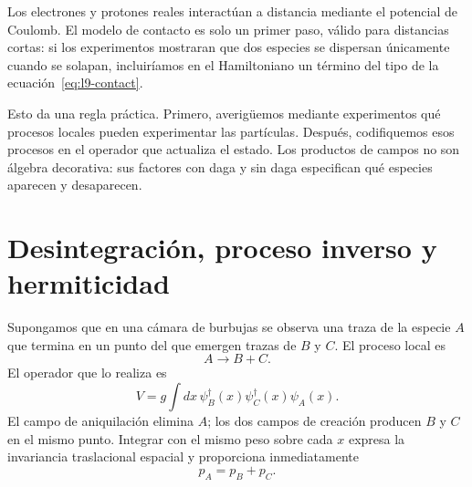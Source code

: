 Los electrones y protones reales interactúan a distancia mediante el potencial de Coulomb. El modelo de contacto es solo un primer paso, válido para distancias cortas: si los experimentos mostraran que dos especies se dispersan únicamente cuando se solapan, incluiríamos en el Hamiltoniano un término del tipo de la ecuación~\eqref{eq:l9-contact}.

\begin{classroomqa}
\end{classroomqa}

Esto da una regla práctica. Primero, averigüemos mediante experimentos qué procesos locales pueden experimentar las partículas. Después, codifiquemos esos procesos en el operador que actualiza el estado. Los productos de campos no son álgebra decorativa: sus factores con daga y sin daga especifican qué especies aparecen y desaparecen.

\section{Desintegración, proceso inverso y hermiticidad}

Supongamos que en una cámara de burbujas se observa una traza de la especie \(A\) que termina en un punto del que emergen trazas de \(B\) y \(C\). El proceso local es
\begin{equation}
A\longrightarrow B+C.
\end{equation}
El operador que lo realiza es
\begin{equation}
V=g\int dx\,
\psi_B^\dagger(x)\psi_C^\dagger(x)\psi_A(x).
\label{eq:l9-decay-half}
\end{equation}
El campo de aniquilación elimina \(A\); los dos campos de creación producen \(B\) y \(C\) en el mismo punto. Integrar con el mismo peso sobre cada \(x\) expresa la invariancia traslacional espacial y proporciona inmediatamente
\begin{equation}
p_A=p_B+p_C.
\end{equation}

